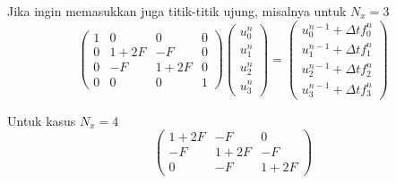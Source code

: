 Jika ingin memasukkan juga titik-titik ujung, misalnya untuk $N_{x}=3$
\[
\left(\begin{array}{cccc}
1 & 0 & 0 & 0\\
0 & 1+2F & -F & 0\\
0 & -F & 1+2F & 0\\
0 & 0 & 0 & 1
\end{array}\right)\left(\begin{array}{c}
u_{0}^{n}\\
u_{1}^{n}\\
u_{2}^{n}\\
u_{3}^{n}
\end{array}\right)=\left(\begin{array}{c}
u_{0}^{n-1}+\Delta tf_{0}^{n}\\
u_{1}^{n-1}+\Delta tf_{1}^{n}\\
u_{2}^{n-1}+\Delta tf_{2}^{n}\\
u_{3}^{n-1}+\Delta tf_{3}^{n}
\end{array}\right)
\]

Untuk kasus $N_{x}=4$
\[
\left(\begin{array}{ccc}
1+2F & -F & 0\\
-F & 1+2F & -F\\
0 & -F & 1+2F
\end{array}\right)
\]








